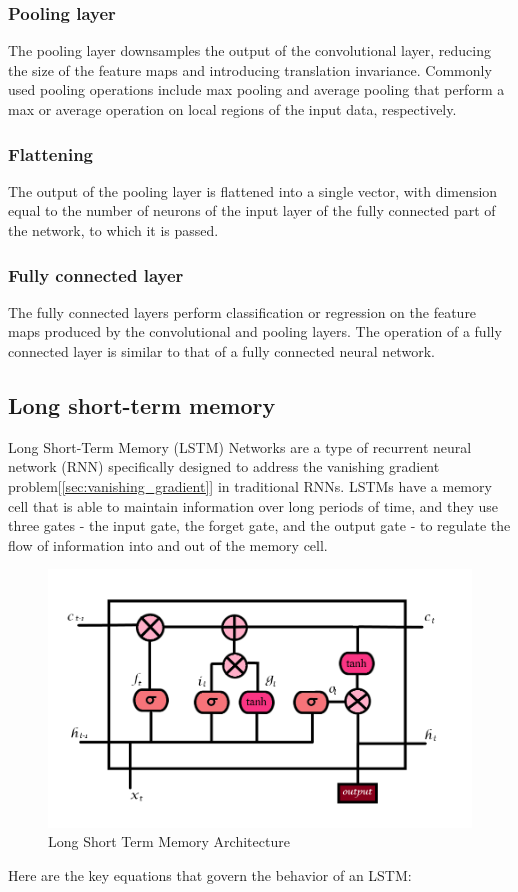 \documentclass[a4paper]{sapthesis}
\begin{document}
\subsubsection{Pooling layer}
The pooling layer downsamples the output of the convolutional 
layer, reducing the size of the feature maps and introducing translation
 invariance. Commonly used pooling operations include max pooling and
average pooling that perform a max or average operation on local regions
 of the input data, respectively.
\subsubsection{Flattening}
The output of the pooling layer is flattened into a
 single vector, with dimension equal to the number of neurons of the
 input layer of the fully connected part of the network,
 to which it is passed.
\subsubsection{Fully connected layer}
The fully connected layers perform classification
 or regression on the feature maps produced by the convolutional and
  pooling layers. The operation of a fully connected layer is similar 
  to that of a fully connected neural network.
\subsection{Long short-term memory}
Long Short-Term Memory (LSTM) Networks are a type of recurrent neural 
network (RNN) specifically designed to address the vanishing 
gradient problem[\ref{sec:vanishing_gradient}] in traditional RNNs. LSTMs have a memory cell that is
 able to maintain information over long periods of time, and they use 
 three gates - the input gate, the forget gate, and the output gate -
  to regulate the flow of information into and out of the memory cell.
  \begin{figure}[h]
    \includegraphics[scale=0.5]{lstm}
    \centering
    \caption{Long Short Term Memory Architecture}\label{fig:lstm}
    \end{figure} 
Here are the key equations that govern the behavior of an LSTM:
\end{document}
